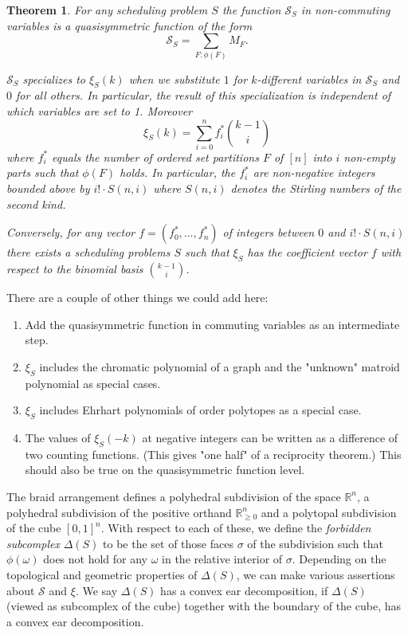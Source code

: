 \documentclass[12pt,reqno]{amsart}
\numberwithin{definition}{section}
\newtheorem{theorem}[definition]{Theorem}
\newcommand{\RR}{\mathbb{R}}
\newcommand{\SSS}{\mathcal{S}}
\begin{document}
\begin{theorem}
For any scheduling problem $S$ the function $\SSS_S$ in non-commuting variables is a quasisymmetric function of the form
\[
  \SSS_S = \sum_{F: \phi(F)} M_F.
\]

$\SSS_S$ specializes to $\xi_S(k)$ when we substitute $1$ for $k$-different variables in $\SSS_S$ and $0$ for all others. In particular, the result of this specialization is independent of which variables are set to 1. Moreover
\[
  \xi_S(k) = \sum_{i=0}^n f_i^* \binom{k-1}{i}
\]
where $f_i^*$ equals the number of ordered set partitions $F$ of $[n]$ into $i$ non-empty parts such that $\phi(F)$ holds. In particular, the $f_i^*$ are non-negative integers bounded above by $i!\cdot S(n,i)$ where $S(n,i)$ denotes the Stirling numbers of the second kind.

Conversely, for any vector $f=(f_0^*,\ldots,f_n^*)$ of integers between $0$ and $i!\cdot S(n,i)$ there exists a scheduling problems $S$ such that $\xi_S$ has the coefficient vector $f$ with respect to the binomial basis $\binom{k-1}{i}$.
\end{theorem}

There are a couple of other things we could add here:
\begin{enumerate}
\item Add the quasisymmetric function in commuting variables as an intermediate step.
\item $\xi_S$ includes the chromatic polynomial of a graph and the "unknown" matroid polynomial as special cases.
\item $\xi_S$ includes Ehrhart polynomials of order polytopes as a special case.
\item The values of $\xi_S(-k)$ at negative integers can be written as a difference of two counting functions. (This gives "one half" of a reciprocity theorem.) This should also be true on the quasisymmetric function level.
\end{enumerate}

The braid arrangement defines a polyhedral subdivision of the space $\RR^n$, a polyhedral subdivision of the positive orthand $\RR_{\geq 0}^n$ and a polytopal subdivision of the cube $[0,1]^n$. With respect to each of these, we define the \emph{forbidden subcomplex} $\Delta(S)$ to be the set of those faces $\sigma$ of the subdivision such that $\phi(\omega)$ does not hold for any $\omega$ in the relative interior of $\sigma$. Depending on the topological and geometric properties of $\Delta(S)$, we can make various assertions about $\SSS$ and $\xi$. We say $\Delta(S)$ has a convex ear decomposition, if $\Delta(S)$ (viewed as subcomplex of the cube) together with the boundary of the cube, has a convex ear decomposition.
\end{document}
